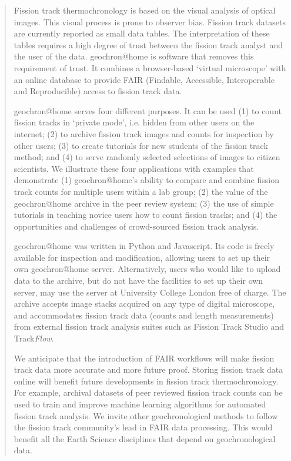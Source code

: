 \documentclass[gchron, manuscript]{copernicus}
\begin{document}
\begin{abstract}
Fission track thermochronology is based on the visual analysis of
optical images. This visual process is prone to observer bias. Fission
track datasets are currently reported as small data tables. The
interpretation of these tables requires a high degree of trust between
the fission track analyst and the user of the data. geochron@home is
software that removes this requirement of trust. It combines a
browser-based `virtual microscope' with an online database to provide
FAIR (Findable, Accessible, Interoperable and Reproducible) access to
fission track data.\medskip

geochron@home serves four different purposes. It can be used (1) to
count fission tracks in `private mode', i.e. hidden from other users
on the internet; (2) to archive fission track images and counts for
inspection by other users; (3) to create tutorials for new students of
the fission track method; and (4) to serve randomly selected
selections of images to citizen scientists. We illustrate these four
applications with examples that demonstrate (1) geochron@home's
ability to compare and combine fission track counts for multiple users
within a lab group; (2) the value of the geochron@home archive in the
peer review system; (3) the use of simple tutorials in teaching novice
users how to count fission tracks; and (4) the opportunities and
challenges of crowd-sourced fission track analysis.\medskip

geochron@home was written in Python and Javascript. Its code is freely
available for inspection and modification, allowing users to set up
their own geochron@home server. Alternatively, users who would like to
upload data to the archive, but do not have the facilities to set up
their own server, may use the server at University College London free
of charge. The archive accepts image stacks acquired on any type of
digital microscope, and accommodates fission track data (counts and
length measurements) from external fission track analysis suites such
as Fission Track Studio and Track\emph{Flow}.\medskip

We anticipate that the introduction of FAIR workflows will make
fission track data more accurate and more future proof. Storing
fission track data online will benefit future developments in fission
track thermochronology. For example, archival datasets of peer
reviewed fission track counts can be used to train and improve machine
learning algorithms for automated fission track analysis. We invite
other geochronological methods to follow the fission track community's
lead in FAIR data processing. This would benefit all the Earth Science
disciplines that depend on geochronological data.
\end{abstract}
\end{document}
